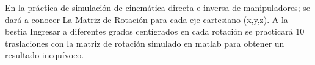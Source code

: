 \documentclass[10pt,stdletter,dateno,sigleft]{newlfm}
\date\\[27 de Septiembre del 2019] %
\begin{document}
\date{FECHA 2019}
\begin{newlfm}

En la práctica de simulación de cinemática directa e inversa de manipuladores;  se dará a conocer La Matriz de Rotación para cada eje  cartesiano (x,y,z). A la bestia Ingresar a diferentes grados centígrados en cada rotación se practicará 10 traslaciones con la matriz de rotación simulado en matlab para obtener un resultado inequívoco.





\end{newlfm}
\end{document}
